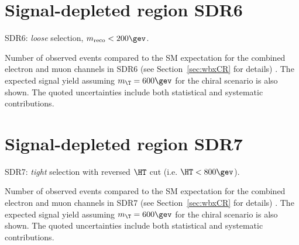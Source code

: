 \clearpage

%


\clearpage

\section{Signal-depleted region SDR6}
\label{sec:DataMC_CR6}

SDR6: {\sl loose} selection, $m_{\rm reco}<200\gev$. 

\begin{table}[h!]
\begin{center}

\caption{\small{Number of observed events compared to the SM expectation for
the combined electron and muon channels in SDR6 (see Section~\ref{sec:wbxCR} for details) . 
The expected signal yield assuming $m_{\T}=600\gev$ for the chiral scenario is also shown. 
The quoted uncertainties include both statistical and systematic contributions.}}
\label{tab:CR6_1W_evtable}
\end{center}
\end{table}

\clearpage

%


\clearpage

\section{Signal-depleted region SDR7}
\label{sec:DataMC_CR7}

SDR7: {\sl tight} selection with reversed $\HT$ cut (i.e. $\HT<800\gev$).

\begin{table}[h!]
\begin{center}

\caption{\small{Number of observed events compared to the SM expectation for
the combined electron and muon channels in SDR7 (see Section~\ref{sec:wbxCR} for details) . 
The expected signal yield assuming $m_{\T}=600\gev$ for the chiral scenario is also shown. 
The quoted uncertainties include both statistical and systematic contributions.}}
\label{tab:CR7_1W_evtable}
\end{center}
\end{table}

\clearpage

